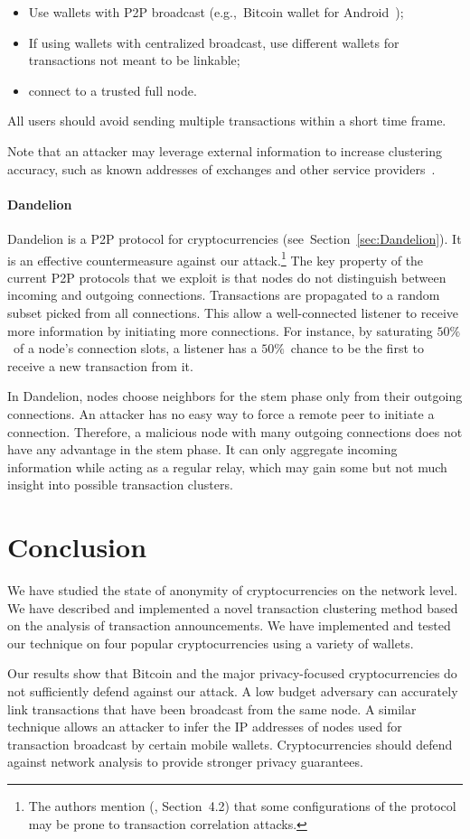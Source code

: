 \begin{itemize}
	\item Use wallets with P2P broadcast (e.g.,~Bitcoin wallet for Android~\cite{BitcoinWallet});
	\item If using wallets with centralized broadcast, use different wallets for transactions not meant to be linkable;
	\item connect to a trusted full node.
\end{itemize}

All users should avoid sending multiple transactions within a short time frame.

Note that an attacker may leverage external information to increase clustering accuracy, such as known addresses of exchanges and other service providers~\cite{Walletexplorer}.

\paragraph{Dandelion}
Dandelion is a P2P protocol for cryptocurrencies (see~Section~\ref{sec:Dandelion}).
It is an effective countermeasure against our attack.\footnote{The authors mention (\cite{Fanti2018}, Section~4.2) that some configurations of the protocol may be prone to transaction correlation attacks.}
The key property of the current P2P protocols that we exploit is that nodes do not distinguish between incoming and outgoing connections.
Transactions are propagated to a random subset picked from all connections.
This allow a well-connected listener to receive more information by initiating more connections.
For instance, by saturating $50\%$~of a node's connection slots, a listener has a $50\%$~chance to be the first to receive a new transaction from it.

In Dandelion, nodes choose neighbors for the stem phase only from their outgoing connections.
An attacker has no easy way to force a remote peer to initiate a connection.
Therefore, a malicious node with many outgoing connections does not have any advantage in the stem phase.
It can only aggregate incoming information while acting as a regular relay, which may gain some but not much insight into possible transaction clusters.


\section{Conclusion} \label{sec:Ch03Conclusion}

We have studied the state of anonymity of cryptocurrencies on the network level.
We have described and implemented a novel transaction clustering method based on the analysis of transaction announcements.
We have implemented and tested our technique on four popular cryptocurrencies using a variety of wallets.

Our results show that Bitcoin and the major privacy-focused cryptocurrencies do not sufficiently defend against our attack.
A low budget adversary can accurately link transactions that have been broadcast from the same node.
A similar technique allows an attacker to infer the IP addresses of nodes used for transaction broadcast by certain mobile wallets.
Cryptocurrencies should defend against network analysis to provide stronger privacy guarantees.
